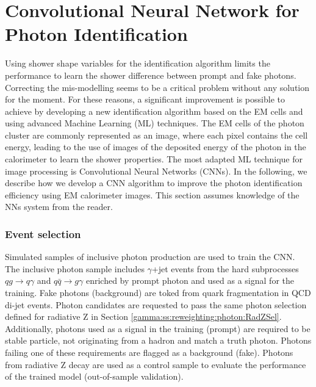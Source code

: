 \section{Convolutional Neural Network for Photon Identification}
\label{gamma:CNN}
Using shower shape variables for the identification algorithm limits the performance to learn the shower difference between prompt and fake photons. Correcting the mis-modelling seems to be a critical problem without any solution for the moment. For these reasons, a significant improvement is possible to achieve by developing a new identification algorithm based on the EM cells and using advanced Machine Learning (ML) techniques. The EM cells of the photon cluster are commonly represented as an image, where each pixel contains the cell energy, leading to the use of images of the deposited energy of the photon in the calorimeter to learn the shower properties. The most adapted ML technique for image processing is Convolutional Neural Networks (CNNs). In the following, we describe how we develop a CNN algorithm to improve the photon identification efficiency using EM calorimeter images. This section assumes knowledge of the NNs system from the reader. 

\subsubsection{Event selection}
Simulated samples of inclusive photon production are used to train the CNN. The inclusive photon sample includes $\gamma$+jet events from the hard subprocesses $qg \rightarrow q\gamma$ and $ q\bar{q}\rightarrow g\gamma$ enriched by prompt photon and used as a signal for the training. Fake photons (background) are toked from quark fragmentation in QCD di-jet events. Photon candidates are requested to pass the same photon selection defined for radiative Z in Section \ref{gamma:ss:reweighting:photon:RadZSel}. Additionally, photons used as a signal in the training (prompt) are required to be stable particle, not originating from a hadron and match a truth photon. Photons failing one of these requirements are flagged as a background (fake). Photons from radiative Z decay are used as a control sample to evaluate the performance of the trained model (out-of-sample validation).

